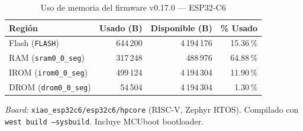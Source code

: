 
\begin{table}[htbp]
\centering
\caption{Uso de memoria del firmware v0.17.0 — ESP32-C6}
\label{tab:memory-v017}
\begin{tabular}{l r r r}
\toprule
\textbf{Región} & \textbf{Usado (B)} & \textbf{Disponible (B)} & \textbf{\% Usado} \\
\midrule
Flash (\texttt{FLASH})      & 644\,200  & 4\,194\,176 & 15.36\,\% \\
RAM (\texttt{sram0\_0\_seg}) & 317\,248  & 488\,976    & 64.88\,\% \\
IROM (\texttt{irom0\_0\_seg}) & 499\,124 & 4\,194\,304 & 11.90\,\% \\
DROM (\texttt{drom0\_0\_seg}) & 54\,504  & 4\,194\,304 & 1.30\,\% \\
\bottomrule
\end{tabular}

\smallskip
\footnotesize
\textit{Board:} \texttt{xiao\_esp32c6/esp32c6/hpcore} (RISC-V, Zephyr RTOS).
Compilado con \texttt{west build --sysbuild}. Incluye MCUboot bootloader.
\end{table}
